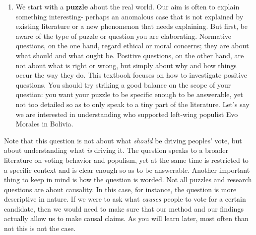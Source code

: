 \documentclass{book}
\providecommand{\tightlist}{%
  \setlength{\itemsep}{0pt}\setlength{\parskip}{0pt}}
\newenvironment{shaded*}{
    \begin{center}
    \begin{tabular}{|p{0.9\textwidth}|}
    \hline\\
    }
    { 
    \\\\\hline
    \end{tabular} 
    \end{center}
}
\begin{document}
\begin{enumerate}
\def\labelenumi{\arabic{enumi}.}
\tightlist
\item
  We start with a \textbf{puzzle} about the real world. Our aim is often to
  explain something interesting- perhaps an anomalous case that is not
  explained by existing literature or a new phenomenon that needs explaining.
  But first, be aware of the type of puzzle or question you are elaborating.
  Normative questions, on the one hand, regard ethical or moral concerns; they
  are about what should and what ought be. Positive questions, on the other
  hand, are not about what is right or wrong, but simply about why and how
  things occur the way they do. This textbook focuses on how to investigate
  positive questions. You should try striking a good balance on the scope of
  your question: you want your puzzle to be specific enough to be answerable,
  yet not too detailed so as to only speak to a tiny part of the literature.
  Let's say we are interested in understanding who supported left-wing
  populist Evo Morales in Bolivia.
\end{enumerate}

\begin{shaded*}

Note that this question is not about what \emph{should} be driving peoples'
vote, but about understanding what \emph{is} driving it. The question speaks
to a broader literature on voting behavior and populism, yet at the same time
is restricted to a specific context and is clear enough so as to be
answerable. Another important thing to keep in mind is how the question is
worded. Not all puzzles and research questions are about causality. In this
case, for instance, the question is more descriptive in nature. If we were to
ask what \emph{causes} people to vote for a certain candidate, then we would
need to make sure that our method and our findings actually allow us to make
causal claims. As you will learn later, most often than not this is not the
case.

\end{shaded*}
\end{document}
